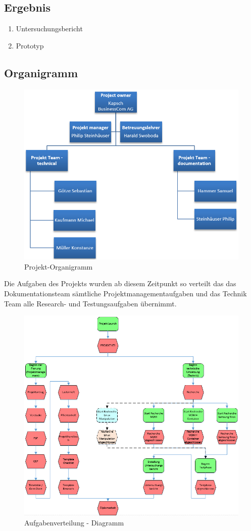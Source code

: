 \subsection{Ergebnis}
\begin{enumerate}
	\item Untersuchungsbericht
	\item Prototyp
\end{enumerate}

\subsection{Organigramm}
\begin{figure}[H]
	\includegraphics[scale=0.6]{Images/organigramm}
	\caption{Projekt-Organigramm}
\end{figure}
Die Aufgaben des Projekts wurden ab diesem Zeitpunkt so verteilt das das Dokumentationsteam sämtliche Projektmanagementaufgaben und das Technik Team alle Research- und Testungsaufgaben übernimmt.
\begin{figure}[H]
	\includegraphics[scale=0.7]{Images/arbeitsteilung}
	\caption{Aufgabenverteilung - Diagramm}
\end{figure}
